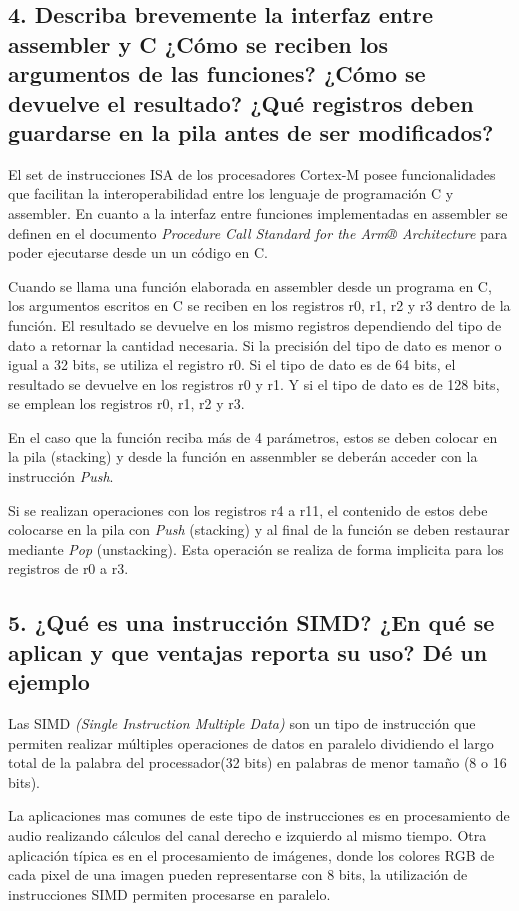 \documentclass[10pt,a4paper,twoside,spanish]{article}	%
\begin{document}
\subsection*{4. Describa brevemente la interfaz entre assembler y C ¿Cómo se reciben los argumentos de las funciones? ¿Cómo se devuelve el resultado? ¿Qué registros deben guardarse en la pila antes de ser modificados?}


El set de instrucciones ISA de los procesadores Cortex-M posee funcionalidades que facilitan la 
interoperabilidad entre los lenguaje de programación C y assembler. En cuanto a la interfaz entre funciones implementadas en assembler se definen en el documento \textit{Procedure Call Standard for the Arm® Architecture} para poder ejecutarse desde un un código en C.

Cuando se llama una función elaborada en assembler desde un programa en C, los argumentos escritos en C se reciben en los registros r0, r1, r2 y r3 dentro de la función. El resultado se devuelve en los mismo registros dependiendo del tipo de dato a retornar la cantidad necesaria. Si la precisión del tipo de dato es menor o igual a 32 bits, se utiliza el registro r0. Si el tipo de dato es de 64 bits, el resultado se devuelve en los registros r0 y r1. Y si el tipo de dato es de 128 bits, se emplean los registros r0, r1, r2 y r3.

En el caso que la función reciba más de 4 parámetros, estos se deben  colocar en la pila (stacking) y desde la función en assenmbler se deberán acceder con la instrucción \textit{Push}.

Si se realizan operaciones con los registros r4 a r11, el contenido de estos debe colocarse en la pila con \textit{Push} (stacking) y al final de la  función se deben restaurar mediante \textit{Pop} (unstacking). Esta operación se realiza de forma implicita para los registros de r0 a r3.


\subsection*{5. ¿Qué es una instrucción SIMD? ¿En qué se aplican y que ventajas reporta su uso? Dé un ejemplo}

Las SIMD \textit{(Single Instruction Multiple Data)} son un tipo de instrucción que permiten realizar múltiples operaciones de datos en paralelo dividiendo el largo total de la palabra del processador(32 bits) en palabras de menor tamaño (8 o 16 bits).

La aplicaciones mas comunes de este tipo de instrucciones es en procesamiento de audio realizando cálculos del canal derecho e izquierdo al mismo tiempo. Otra aplicación típica es en el procesamiento de imágenes, donde los colores RGB de cada pixel de una imagen pueden representarse con 8 bits, la utilización de instrucciones SIMD permiten procesarse en paralelo.
\end{document}
